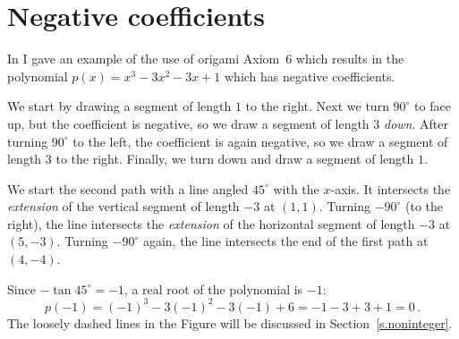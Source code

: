 \documentclass[11pt,a4paper]{article}
\begin{document}
\newpage

\section{Negative coefficients}\label{s.negative}

In \cite{moti-origami} I gave an example of the use of origami Axiom~6 which results in the polynomial $p(x)=x^3-3x^2-3x+1$ which has negative coefficients.

We start by drawing a segment of length $1$ to the right. Next we turn $90^\circ$ to face up, but the coefficient is negative, so we draw a segment of length $3$ \emph{down}. After turning $90^\circ$ to the left, the coefficient is again negative, so we draw a segment of length $3$ to the right. Finally, we turn down and draw a segment of length $1$.

We start the second path with a line angled $45^\circ$ with the $x$-axis. It intersects the \emph{extension} of the vertical segment of length $-3$ at $(1,1)$. Turning $-90^\circ$ (to the right), the line intersects the \emph{extension} of the horizontal segment of length $-3$  at $(5,-3)$. Turning $-90^\circ$ again, the line intersects the end of the first path at $(4,-4)$.

Since $-\tan 45^\circ=-1$, a real root of the polynomial is $-1$:
\[
p(-1)=(-1)^3-3(-1)^2-3(-1)+6=-1-3+3+1=0\,.
\]
The loosely dashed lines in the Figure will be discussed  in Section~\ref{s.noninteger}.
\end{document}
